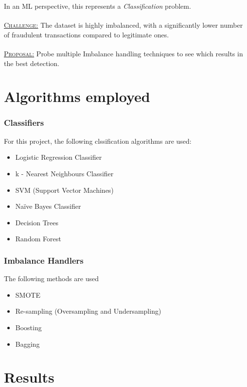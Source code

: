 \documentclass[letterpaper, 10 pt, conference]{ieeeconf}  %
\begin{document}
In an ML perspective, this represents a \emph{Classification} problem.\\\\
\uline{\textsc{Challenge:}} The dataset is highly imbalanced, with a significantly lower number of fraudulent transactions compared to legitimate ones.\\\\
\uline{\textsc{Proposal:}} Probe multiple Imbalance handling techniques to see which results in the best detection.


\section{Algorithms employed}
\subsubsection{Classifiers}
For this project, the following clssification algorithms are used:
\begin{itemize}
    \item Logistic Regression Classifier
    \item k - Nearest Neighbours Classifier
    \item SVM (Support Vector Machines)
    \item Naïve Bayes Classifier
    \item Decision Trees
    \item Random Forest
\end{itemize}

\subsubsection{Imbalance Handlers}
The following methods are used
\begin{itemize}
    \item SMOTE
    \item Re-sampling (Oversampling and Undersampling)
    \item Boosting
    \item Bagging
    
\end{itemize}

\section{Results}\label{sec:result}
\end{document}
